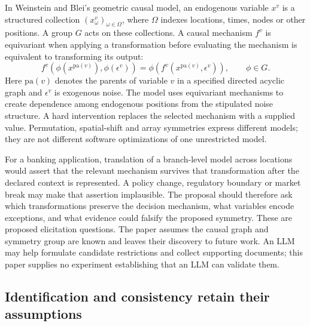 In Weinstein and Blei's geometric causal model, an endogenous variable
$x^v$ is a structured collection $(x^v_\omega)_{\omega\in\Omega}$,
where $\Omega$ indexes locations, times, nodes or other positions. A
group $G$ acts on these collections. A causal mechanism $f^v$ is equivariant
when applying a transformation before evaluating the mechanism is equivalent
to transforming its output:
\begin{equation}
 f^v(\phi(x^{\mathrm{pa}(v)}),\phi(\epsilon^v))
 =\phi\!\left(f^v(x^{\mathrm{pa}(v)},\epsilon^v)\right),
 \qquad \phi\in G.
 \label{exec23:structured-equivariance}
\end{equation}
Here $\mathrm{pa}(v)$ denotes the parents of variable $v$ in a specified
directed acyclic graph and $\epsilon^v$ is exogenous noise. The model uses
equivariant mechanisms to create dependence among endogenous positions from
the stipulated noise structure. A hard intervention replaces the selected
mechanism with a supplied value. Permutation, spatial-shift and array
symmetries express different models; they are not different software
optimizations of one unrestricted model.
\citep{exec23_geometric_models}

For a banking application, translation of a branch-level model across
locations would assert that the relevant mechanism survives that
transformation after the declared context is represented. A policy change,
regulatory boundary or market break may make that assertion implausible.
The proposal should therefore ask which transformations preserve the
decision mechanism, what variables encode exceptions, and what evidence
could falsify the proposed symmetry. These are proposed elicitation questions.
The paper assumes the causal graph and symmetry group are known and leaves
their discovery to future work. An LLM may help formulate candidate
restrictions and collect supporting documents; this paper supplies no
experiment establishing that an LLM can validate them.
\citep{exec23_geometric_models}

\subsection{Identification and consistency retain their assumptions}
\label{exec23:structured-identification}

